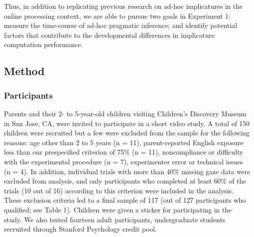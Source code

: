 \documentclass[a4paper,man,apacite,floatsintext]{apa6}
\begin{document}
Thus, in addition to replicating previous research on ad-hoc
implicatures in the online processing context, we are able to pursue two
goals in Experiment 1: measure the time-course of ad-hoc pragmatic
inference; and identify potential factors that contribute to the
developmental differences in implicature computation performance.

\subsection{Method}\label{method}

\subsubsection{Participants}\label{participants}

Parents and their 2- to 5-year-old children visiting Children's
Discovery Museum in San Jose, CA, were invited to participate in a short
video study. A total of 150 children were recruited but a few were
excluded from the sample for the following reasons: age other than 2 to
5 years (n = 11), parent-reported English exposure less than our
prespecified criterion of 75\% (n = 11), noncompliance or difficulty
with the experimental procedure (n = 7), experimenter error or technical
issues (n = 4). In addition, individual trials with more than 40\%
missing gaze data were excluded from analysis, and only participants who
completed at least 60\% of the trials (10 out of 16) according to this
criterion were included in the analysis. These exclusion criteria led to
a final sample of 117 (out of 127 participants who qualified; see Table
1). Children were given a sticker for participating in the study. We
also tested fourteen adult participants, undergraduate students
recruited through Stanford Psychology credit pool.
\end{document}
